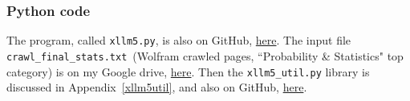 \documentclass[oneside,10pt]{book}
\begin{document}
\begin{comment}
crawl itl.nist.gov/div898/handbook/index.htm


## crawl my books char char 
## identify \index{xxx} and \section \subsection \subsubsection ; for each index add list of section / chapters / books
##      use it to complement my LLM

### twitter2.xlsx on google drive, and DSC-master-capri5.xlsx
###                 to predict pageviews
##  Wikipedia directory: wikipedia.org/wiki/Category:Machine_learning (+ indexes)
##       poor : https://en.wikipedia.org/wiki/Category:Statistics

    ## Lemmatization and stemming are the techniques of keyword normalization, while Levenshtein and Soundex are techniques of string matching.
    ##             https://en.wikipedia.org/wiki/Edit_distance
    ##             https://huggingface.co/tasks/sentence-similarity
    ##             https://en.wikipedia.org/wiki/Semantic_similarity
    ### in stackexchange, use tags to extend categoriries // use top words

#querry = "empirical distribution" "berry" ## "Entropy" # "Convolution" # "Spectral analysis" # "time series" # "Autocorrelation" ### "Maximum"  # "Outlier" # "Extreme"  #  "Range"  ### "Markov"   ### "Beta"
######### add categories: Applied Mathematics / Calculus and Analysis / Discrete Mathematics
\end{comment}

\subsubsection{Python code}\label{og4u9b}

The program, called \texttt{xllm5.py}, is also on GitHub, \href{https://github.com/VincentGranville/Large-Language-Models/blob/main/xllm5/xllm5.py}{here}. 
The input file \texttt{crawl\_final\_stats.txt}~(Wolfram crawled pages, ``Probability \& Statistics" top category)   is on my Google drive, \href{https://drive.google.com/file/d/1H_xhfhzIPnO8oe9xlwCDWWM9OR5m81wd/view?usp=drive_link}{here}. Then the \texttt{xllm5\_util.py} library is discussed in 
Appendix~\ref{xllm5util}, and also on GitHub, \href{https://github.com/VincentGranville/Large-Language-Models/blob/main/xllm5/xllm5_util.py}{here}. 
\vspace{1ex}
\end{document}
